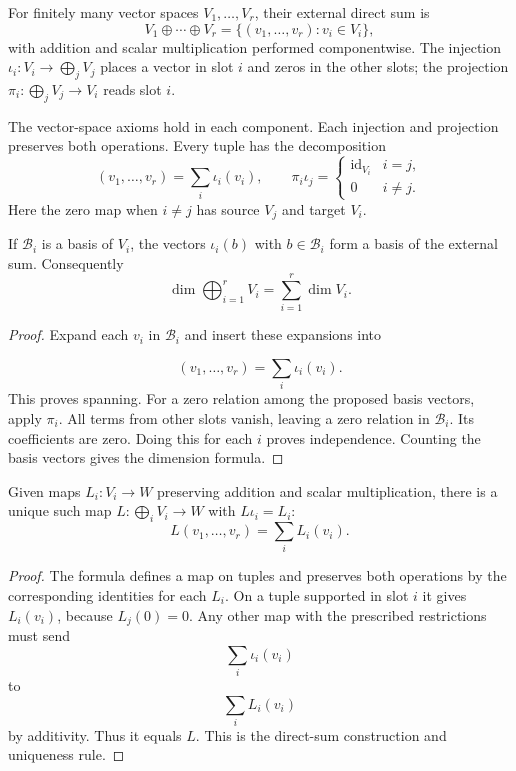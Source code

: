 \begin{definition}
For finitely many vector spaces $V_1,\ldots,V_r$, their external direct sum is
\[
V_1\oplus\cdots\oplus V_r=\{(v_1,\ldots,v_r):v_i\in V_i\},
\]
with addition and scalar multiplication performed componentwise.
The injection $\iota_i:V_i\to\bigoplus_jV_j$ places a vector in slot $i$
and zeros in the other slots; the projection $\pi_i:\bigoplus_jV_j\to V_i$
reads slot $i$.
\end{definition}
The vector-space axioms hold in each component. Each injection and projection
preserves both operations. Every tuple has the decomposition
\[
(v_1,\ldots,v_r)=\sum_i\iota_i(v_i),\qquad
\pi_i\iota_j=\begin{cases}\operatorname{id}_{V_i}&i=j,\\0&i\ne j.\end{cases}
\]
Here the zero map when $i\ne j$ has source $V_j$ and target $V_i$.
\begin{proposition}
If $\mathcal B_i$ is a basis of $V_i$, the vectors $\iota_i(b)$ with
$b\in\mathcal B_i$ form a basis of the external sum. Consequently
\[
\dim\bigoplus_{i=1}^rV_i=\sum_{i=1}^r\dim V_i.
\]
\end{proposition}
\begin{proof}
Expand each $v_i$ in $\mathcal B_i$ and insert these expansions into

\[
(v_1,\ldots,v_r)=\sum_i\iota_i(v_i).
\]
 This proves spanning.
For a zero relation among the proposed basis vectors, apply $\pi_i$.
All terms from other slots vanish, leaving a zero relation in $\mathcal B_i$.
Its coefficients are zero. Doing this for each $i$ proves independence.
Counting the basis vectors gives the dimension formula.
\end{proof}
\begin{proposition}\label{prop:direct-sum-maps}
Given maps $L_i:V_i\to W$ preserving addition and scalar multiplication,
there is a unique such map $L:\bigoplus_iV_i\to W$ with $L\iota_i=L_i$:
\[
L(v_1,\ldots,v_r)=\sum_iL_i(v_i).
\]
\end{proposition}
\begin{proof}
The formula defines a map on tuples and preserves both operations by the
corresponding identities for each $L_i$. On a tuple supported in slot $i$
it gives $L_i(v_i)$, because $L_j(0)=0$. Any other map with the prescribed
restrictions must send
\[
\sum_i\iota_i(v_i)
\]
 to
\[
\sum_iL_i(v_i)
\]
 by additivity.
Thus it equals $L$. This is the direct-sum construction and uniqueness rule.
\end{proof}

